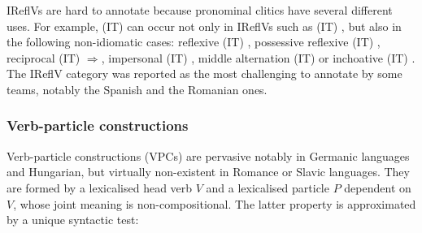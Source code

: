 \documentclass[output=paper,modfonts]{langscibook}
\begin{document}
IReflVs are hard to annotate because pronominal clitics have several different uses. %
For example, %
(IT)  can occur not only in IReflVs such as (IT) , but also 
in the following non-idiomatic cases: reflexive (IT) , possessive reflexive (IT)  , reciprocal (IT)  $\Rightarrow$, impersonal (IT) ,  middle alternation (IT)  or inchoative (IT) . 
The IReflV category was reported as the most challenging to annotate by some teams, notably the Spanish and the Romanian ones.

\subsubsection{Verb-particle constructions}
\label{sec:vpcs}
%
Verb-particle constructions (VPCs) are pervasive notably in Germanic languages and Hungarian, but virtually non-existent in Romance or Slavic languages. They are formed by a lexicalised head verb $V$ and a lexicalised particle $P$ dependent on $V$, whose joint meaning is non-compositional. The latter property is approximated by a unique syntactic test:

\end{document}

